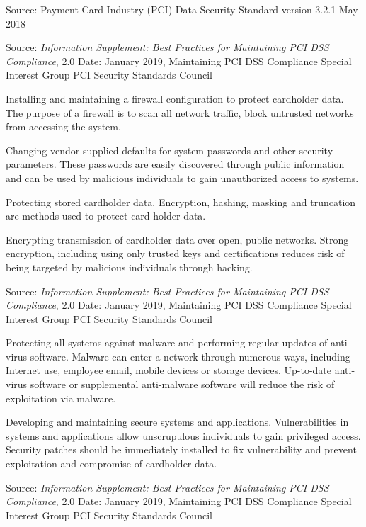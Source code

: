 \documentclass[Screen16to9,17pt]{foils}
\begin{document}
Source: Payment Card Industry (PCI)
Data Security Standard version 3.2.1 May 2018




Source:
\emph{Information Supplement:
Best Practices for Maintaining
PCI DSS Compliance}, 2.0
Date: January 2019, Maintaining PCI DSS Compliance Special Interest Group
PCI Security Standards Council



\begin{list1}
\item Installing and maintaining a firewall configuration to protect cardholder data. The purpose of a firewall is to scan all network traffic, block untrusted networks from accessing the system.
\item Changing vendor-supplied defaults for system passwords and other security parameters. These passwords are easily discovered through public information and can be used by malicious individuals to gain unauthorized access to systems.
\item Protecting stored cardholder data. Encryption, hashing, masking and truncation are methods used to protect card holder data.
\item Encrypting transmission of cardholder data over open, public networks. Strong encryption, including using only trusted keys and certifications reduces risk of being targeted by malicious individuals through hacking.
\end{list1}
Source:
\emph{Information Supplement:
Best Practices for Maintaining
PCI DSS Compliance}, 2.0
Date: January 2019, Maintaining PCI DSS Compliance Special Interest Group
PCI Security Standards Council


\begin{list1}
\item Protecting all systems against malware and performing regular updates of anti-virus software. Malware can enter a network through numerous ways, including Internet use, employee email, mobile devices or storage devices. Up-to-date anti-virus software or supplemental anti-malware software will reduce the risk of exploitation via malware.
\item Developing and maintaining secure systems and applications. Vulnerabilities in systems and applications allow unscrupulous individuals to gain privileged access. Security patches should be immediately installed to fix vulnerability and prevent exploitation and compromise of cardholder data.
\end{list1}
Source:
\emph{Information Supplement:
Best Practices for Maintaining
PCI DSS Compliance}, 2.0
Date: January 2019, Maintaining PCI DSS Compliance Special Interest Group
PCI Security Standards Council
\end{document}
